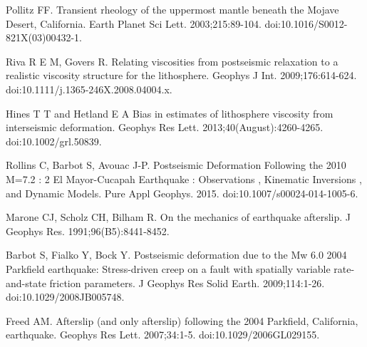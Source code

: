 \documentclass[12pt]{article}
\begin{document}
\begin{thebibliography}{}
 Pollitz FF. Transient rheology
  of the uppermost mantle beneath the Mojave Desert, California. Earth
  Planet Sci Lett. 2003;215:89-104. doi:10.1016/S0012-821X(03)00432-1.

 Riva R E M, Govers
  R. Relating viscosities from postseismic relaxation to a realistic
  viscosity structure for the lithosphere. Geophys J
  Int. 2009;176:614-624. doi:10.1111/j.1365-246X.2008.04004.x.

 Hines T T and
  Hetland E A Bias in estimates of lithosphere viscosity from
  interseismic deformation. Geophys Res
  Lett. 2013;40(August):4260-4265. doi:10.1002/grl.50839.

 Rollins C, Barbot S,
  Avouac J-P. Postseismic Deformation Following the 2010 M=7.2 : 2 El
  Mayor-Cucapah Earthquake : Observations , Kinematic Inversions , and
  Dynamic Models. Pure Appl
  Geophys. 2015. doi:10.1007/s00024-014-1005-6.

 Marone CJ, Scholz CH,
  Bilham R. On the mechanics of earthquake afterslip. J Geophys
  Res. 1991;96(B5):8441-8452.

 Barbot S, Fialko Y, Bock
  Y. Postseismic deformation due to the Mw 6.0 2004 Parkfield
  earthquake: Stress-driven creep on a fault with spatially variable
  rate-and-state friction parameters. J Geophys Res Solid
  Earth. 2009;114:1-26. doi:10.1029/2008JB005748.


 Freed AM. Afterslip (and only
  afterslip) following the 2004 Parkfield, California,
  earthquake. Geophys Res Lett. 2007;34:1-5. doi:10.1029/2006GL029155.




\end{thebibliography}
\end{document}
